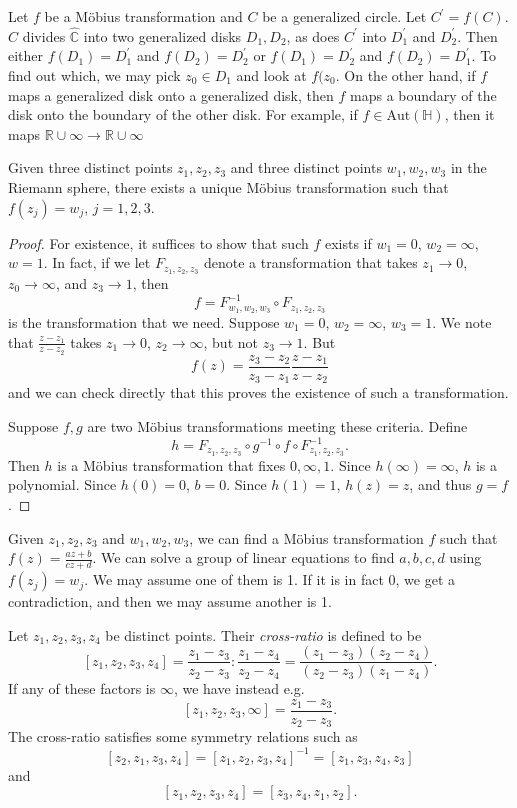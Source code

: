 Let $f$ be a M\"obius transformation and $C$ be a generalized
circle. Let $C^\prime = f(C)$. $C$ divides $\hat{\mathbb{C}}$ into
two generalized disks $D_1, D_2$, as does $C^\prime$ into
$D_1^\prime$ and $D_2^\prime$. Then either
$f(D_1) = D_1^\prime$ and $f(D_2) = D_2^\prime$ or
$f(D_1) = D_2^\prime$ and $f(D_2) = D_1^\prime$. To find out which,
we may pick $z_0 \in D_1$ and look at $f(z_0$. On the other hand,
if $f$ maps a generalized disk onto a generalized disk, then
$f$ maps a boundary of the disk onto the boundary of the other
disk. For example, if $f \in \mathrm{Aut}(\mathbb{H})$, then it maps
$\mathbb{R} \cup {\infty} \to \mathbb{R} \cup {\infty}$

\begin{theorem}
Given three distinct points $z_1, z_2, z_3$ and three distinct points
$w_1, w_2, w_3$ in the Riemann sphere, there exists a unique M\"obius
transformation such that $f(z_j) = w_j$, $j = 1, 2, 3$.
\end{theorem}

\begin{proof}
For existence, it suffices to show that such $f$ exists if $w_1 = 0$,
$w_2 = \infty$, $w = 1$. In fact, if we let $F_{z_1, z_2, z_3}$ denote
a transformation that takes $z_1 \to 0$, $z_0 \to \infty$, and
$z_3 \to 1$, then
$$
f = F_{w_1, w_2, w_3}^{-1} \circ F_{z_1, z_2, z_3}
$$
is the transformation that we need. Suppose $w_1 = 0$,
$w_2 = \infty$, $w_3 = 1$. We note that
$\frac{z - z_1}{z - z_2}$ takes $z_1 \to 0$, $z_2 \to \infty$,
but not $z_3 \to 1$. But
$$
  f(z)
= \frac{z_3 - z_2}
       {z_3 - z_1}
  \frac{z - z_1}
       {z - z_2}
$$
and we can check directly that this proves the existence of
such a transformation.

Suppose $f, g$ are two M\"obius transformations meeting these
criteria. Define
$$
h = F_{z_1,z_2,z_3} \circ g^{-1} \circ f \circ F_{z_1, z_2, z_3}^{-1}.
$$
Then $h$ is a M\"obius transformation that fixes $0, \infty, 1$.
Since $h(\infty) = \infty$, $h$ is a polynomial. Since $h(0) = 0$,
$b = 0$. Since $h(1) = 1$, $h(z) = z$, and thus $g = f$.
\end{proof}

Given $z_1, z_2, z_3$ and $w_1, w_2, w_3$, we can find a M\"obius
transformation $f$ such that $f(z) = \frac{az + b}{cz + d}$.
We can solve a group of linear equations to find $a, b, c, d$
using $f(z_j) = w_j$. We may assume one of them is 1. If it is
in fact 0, we get a contradiction, and then we may assume another
is 1.

\begin{defn}
Let $z_1, z_2, z_3, z_4$ be distinct points. Their \emph{cross-ratio}
is defined to be
$$
  [z_1, z_2, z_3, z_4]
= \frac{z_1 - z_3}{z_2 - z_3}
: \frac{z_1 - z_4}{z_2 - z_4}
= \frac{(z_1 - z_3)(z_2 - z_4)}
       {(z_2 - z_3)(z_1 - z_4)}.
$$
If any of these factors is $\infty$, we have instead e.g.
$$
  [z_1, z_2, z_3, \infty]
= \frac{z_1 - z_3}{z_2 - z_3}.
$$
The cross-ratio satisfies some symmetry relations
such as
$$
  [z_2, z_1, z_3, z_4]
= [z_1, z_2, z_3, z_4]^{-1}
= [z_1, z_3, z_4, z_3]
$$
and
$$
[z_1, z_2, z_3, z_4] = [z_3, z_4, z_1, z_2].
$$
\end{defn}

